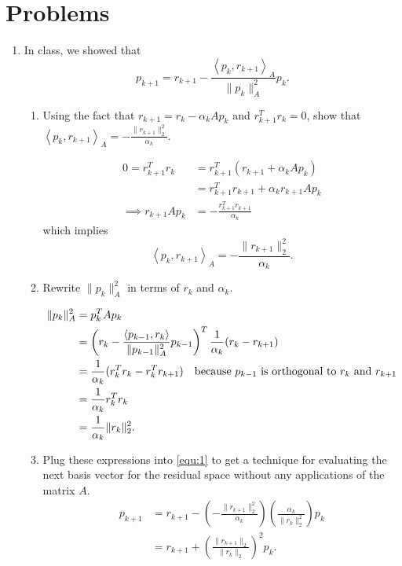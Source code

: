 \documentclass[a4paper,12pt]{article}
\newcommand{\norm}[1]{\lVert #1 \rVert}
\newcommand{\inner}[1]{\left\langle #1 \right\rangle}
\begin{document}
\section*{Problems}
\begin{enumerate}[label = \arabic*)]
	\item In class, we showed that
	\begin{equation}
		p_{k+1} = r_{k+1}- \frac{\inner{p_k,r_{k+1}}_A}{\norm{p_k}_A^2}p_k. \label{equ:1}
	\end{equation}
	\begin{enumerate}[label = (\alph*)]
		\item Using the fact that $ r_{k+1} = r_k - \alpha_k A p_k $ and $ r_{k+1}^T r_k = 0 $, show that $ \inner{p_k, r_{k+1}}_A = -\frac{\norm{r_{k+1}}_2^2}{\alpha_k} $.
		
		\begin{align*}
			0 = r_{k+1}^T r_k &= r_{k+1}^T (r_{k+1} + \alpha_k A p_k) \\
			&= r_{k+1}^T r_{k+1} + \alpha_k r_{k+1} A p_k \\
			\implies r_{k+1} A p_k &= -\frac{r_{k+1}^T r_{k+1}}{\alpha_k}
		\end{align*}
		which implies
		\[
			\inner{p_k, r_{k+1}}_A = -\frac{\norm{r_{k+1}}_2^2}{\alpha_k}.
		\]
		
		\item Rewrite $ \norm{p_k}_A^2 $ in terms of $ r_k $ and $ \alpha_k $.
		
		\begin{align*}
			\norm{p_k}_A^2 &= p_k^T A p_k \\
			&= \left(r_k - \frac{\inner{p_{k-1}, r_k}}{\norm{p_{k-1}}_A^2} p_{k-1} \right)^T \frac{1}{\alpha_k}(r_k - r_{k+1}) \\
			&= \frac{1}{\alpha_k}(r_k^T r_k - r_k^Tr_{k+1}) \quad \text{because $ p_{k-1} $ is orthogonal to $ r_k $ and $ r_{k+1} $} \\
			&= \frac{1}{\alpha_k}r_k^T r_k \\
			&= \frac{1}{\alpha_k} \norm{r_k}_2^2.
		\end{align*}
		
		\item Plug these expressions into \eqref{equ:1} to get a technique for evaluating the next basis vector for the residual space without any applications of the matrix $ A $.
		\begin{align*}
			p_{k+1} &= r_{k+1} - \left(-\frac{\norm{r_{k+1}}_2^2}{\alpha_k}\right)\left(\frac{\alpha_k}{\norm{r_k}_2^2}\right) p_k \\
			&= r_{k+1} + \left(\frac{\norm{r_{k+1}}_2}{\norm{r_k}_2}\right)^2 p_k.
		\end{align*}
	\end{enumerate}


\end{enumerate}
\end{document}
